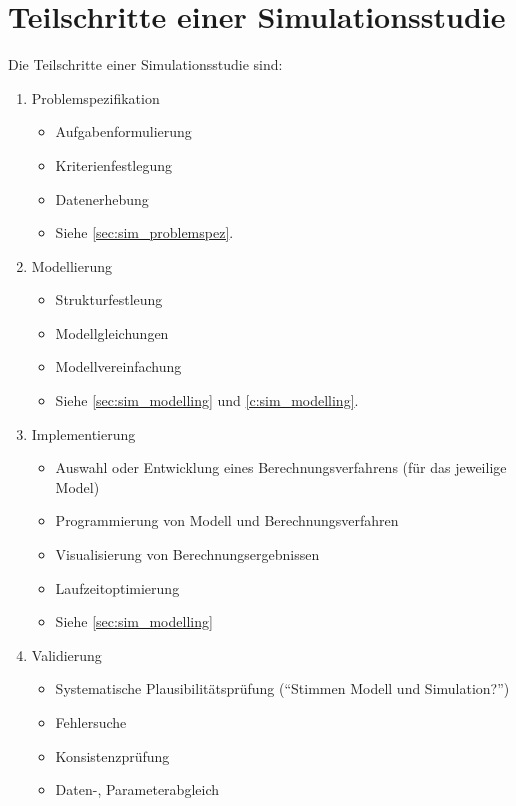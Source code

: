 \documentclass[a4paper, 11pt, accentcolor = tud3b]{tudreport}
\begin{document}
    \chapter{Teilschritte einer Simulationsstudie} %
        Die Teilschritte einer Simulationsstudie sind:
        \begin{enumerate}
        	\item Problemspezifikation
	        	\begin{itemize}
	        		\item Aufgabenformulierung
	        		\item Kriterienfestlegung
	        		\item Datenerhebung
	        		\item Siehe \ref{sec:sim_problemspez}.
	        	\end{itemize}
        	\item Modellierung
	        	\begin{itemize}
	        		\item Strukturfestleung
	        		\item Modellgleichungen
	        		\item Modellvereinfachung
	        		\item Siehe \ref{sec:sim_modelling} und \ref{c:sim_modelling}.
	        	\end{itemize}
        	\item Implementierung
	        	\begin{itemize}
	        		\item Auswahl oder Entwicklung eines Berechnungsverfahrens (für das jeweilige Model)
	        		\item Programmierung von Modell und Berechnungsverfahren
	        		\item Visualisierung von Berechnungsergebnissen
	        		\item Laufzeitoptimierung
	        		\item Siehe \ref{sec:sim_modelling}
	        	\end{itemize}
        	\item Validierung
	        	\begin{itemize}
	        		\item Systematische Plausibilitätsprüfung (\enquote{Stimmen Modell und Simulation?})
	        		\item Fehlersuche
	        		\item Konsistenzprüfung
	        		\item Daten-, Parameterabgleich

\end{itemize}
\end{enumerate}
\end{document}
